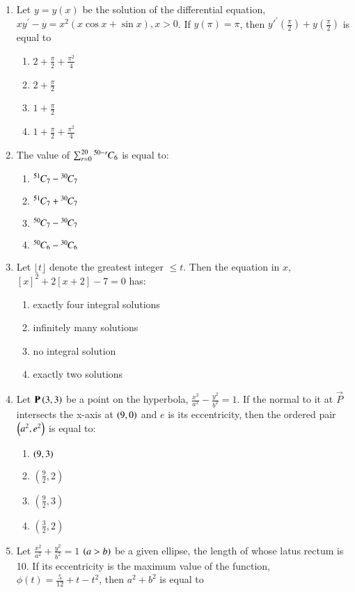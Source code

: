 \documentclass[journal,12pt,twocolumn]{IEEEtran}
\theoremstyle{remark}
\begin{document}
\begin{enumerate}

\item Let $y=y(x)$ be the solution of the differential equation, $xy^\prime-y=x^2(x\cos x+\sin x),x>0$. If $y(\pi)=\pi$, then $y'^\prime(\frac{\pi}{2})+y(\frac{\pi}{2})$ is equal to
    \begin{enumerate}
    \item $2+\frac{\pi}{2}+\frac{\pi^2}{4}$
    \item $2+\frac{\pi}{2}$
    \item $1+\frac{\pi}{2}$
    \item $1+\frac{\pi}{2}+\frac{\pi^2}{4}$
\end{enumerate}    
    \item The value of $\sum_{r=0}^{20}{{}^{50-r}\mkern-1muC_{6}}$ is equal to:
    \begin{enumerate}
        \item ${{}^{51}\mkern-1muC_{7}}-{{}^{30}\mkern-1muC_{7}}$
        \item ${{}^{51}\mkern-1muC_{7}}+{{}^{30}\mkern-1muC_{7}}$
        \item ${{}^{50}\mkern-1muC_{7}}-{{}^{30}\mkern-1muC_{7}}$
        \item ${{}^{50}\mkern-1muC_{6}}-{{}^{30}\mkern-1muC_{6}}$
    \end{enumerate}
\item Let \(\lfloor t\rfloor\) denote the greatest integer \(\leq t\). Then the equation in $x$,$[x]^2+2[x+2]-7=0$ has:
\begin{enumerate}
    \item exactly four integral solutions
    \item infinitely many solutions
    \item no integral solution
    \item exactly two solutions
    \end{enumerate}
\item Let $\mathbf{P}\left(3,3\right)$ be a point on the hyperbola, $\frac{x^2}{a^2}-\frac{y^2}{b^2}=1$. If the normal to it at $\vec{P}$ intersects the x-axis at $\left(9,0\right)$ and $e$ is its eccentricity, then the ordered pair $\left(a^2, e^2\right)$ is equal to:
\begin{enumerate}
    \item $\left(9,3\right)$
    \item $\left(\frac{9}{2},2\right)$
    \item $\left(\frac{9}{2},3\right)$
    \item $\left(\frac{3}{2},2\right)$
\end{enumerate}
\item Let $\frac{x^2}{a^2}+\frac{y^2}{b^2}=1$ $\left(a>b\right)$ be a given ellipse, the length of whose latus rectum is 10. If its eccentricity is the maximum value of the function, $\phi(t)=\frac{5}{12}+t-t^2$, then $a^2 + b^2$ is equal to

\end{enumerate}
\end{document}
